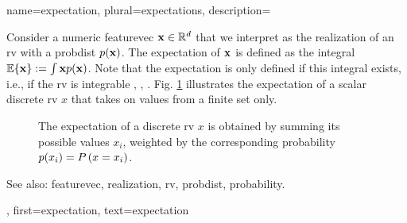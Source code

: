 {name={expectation}, plural={expectations},
  description={Consider a numeric \gls{featurevec} ${\bf x} \in \mathbb{R}^{d}$ 
	that we interpret as the \gls{realization} of an \gls{rv} with a \gls{probdist} $p({\bf x})$. 
	The expectation of ${\bf x}$ is defined as the integral $\mathbb{E} \{ {\bf x} \} := \int {\bf x} p({\bf x})$. 
	Note that the expectation is only defined if this integral exists, i.e., if the \gls{rv} is integrable 
	\cite{RudinBookPrinciplesMatheAnalysis}, \cite{BillingsleyProbMeasure}, \cite{HalmosMeasure}. 
	Fig. \ref{fig_expect_discrete_dict} illustrates the expectation of a scalar discrete \gls{rv} $x$ that takes on values 
	from a finite set only. 
   \begin{figure}[H]
   	\begin{center}
\end{center}
\vspace*{-5mm}
\caption{The expectation of a discrete \gls{rv} $x$ is obtained by summing its possible values $x_{i}$, weighted 
	by the corresponding \gls{probability} $p(x_i) = P\left(x= x_i\right)$. \label{fig_expect_discrete_dict}}
 \end{figure}
		See also: \gls{featurevec}, \gls{realization}, \gls{rv}, \gls{probdist}, \gls{probability}.},
first={expectation},
text={expectation}
}

